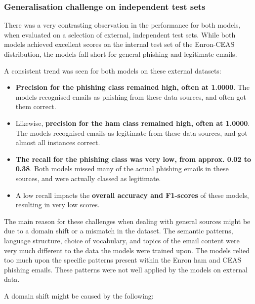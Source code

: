 
\subsubsection*{Generalisation challenge on independent test sets}
There was a very contrasting observation in the performance for both models, when evaluated on a selection of external, independent test sets. While both models achieved excellent scores on the internal test set of the Enron-CEAS distribution, the models fall short for general phishing and legitimate emails.\newline

\noindent A consistent trend was seen for both models on these external datasets:

\begin{itemize}
  \item \textbf{Precision for the phishing class remained high, often at 1.0000}. The models recognised emails as phishing from these data sources, and often got them correct.
  \item Likewise, \textbf{precision for the ham class remained high, often at 1.0000}. The models recognised emails as legitimate from these data sources, and got almost all instances correct.
  \item \textbf{The recall for the phishing class was very low, from approx. 0.02 to 0.38}. Both models missed many of the actual phishing emails in these sources, and were actually classed as legitimate.
  \item A low recall impacts the \textbf{overall accuracy and F1-scores} of these models, resulting in very low scores.
\end{itemize}

The main reason for these challenges when dealing with general  sources might be due to a domain shift or a mismatch in the dataset. The semantic patterns, language structure, choice of vocabulary, and topics of the email content were very much different to the data the models were trained upon. The models relied too much upon the specific patterns present within the Enron ham and CEAS phishing emails. These patterns were not well applied by the models on external data.\newline

\noindent A domain shift might be caused by the following:

